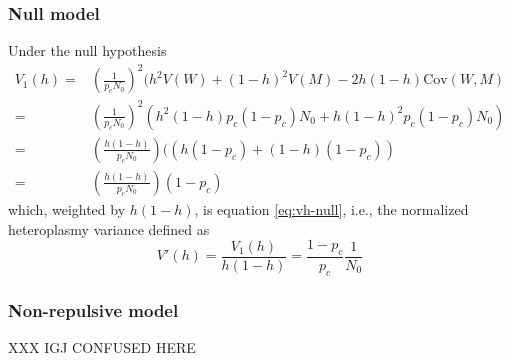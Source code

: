 \documentclass{article}
\begin{document}
\begin{appendices}
\subsubsection*{Null model}\label{app:derivations}
Under the null hypothesis
\begin{equation*}
    \begin{split}
 V_1(h) = & \left(\frac{1}{p_cN_0}\right)^2(h^2V(W)+(1-h)^2V(M)
            -2h(1-h)\mathrm{Cov}(W,M)\\
        = & \left(\frac{1}{p_cN_0}\right)^2(h^2(1-h)p_c(1-p_c)N_0
            +h(1-h)^2p_c(1-p_c)N_0)\\
        = & \left(\frac{h(1-h)}{p_cN_0}\right)((h(1-p_c)+(1-h)(1-p_c))\\
        = & \left(\frac{h(1-h)}{p_cN_0}\right)(1-p_c)
    \end{split}
\end{equation*}
which, weighted by $h(1-h)$, is equation \ref{eq:vh-null}, i.e., the normalized heteroplasmy variance defined as
\begin{equation}\label{eq:app-vh-null}
V'(h)=\frac{V_1(h)}{h(1-h)}=\frac{1-p_c}{p_c}\frac{1}{N_0}
\end{equation}


\subsubsection*{Non-repulsive model}
XXX IGJ CONFUSED HERE


\end{appendices}
\end{document}
